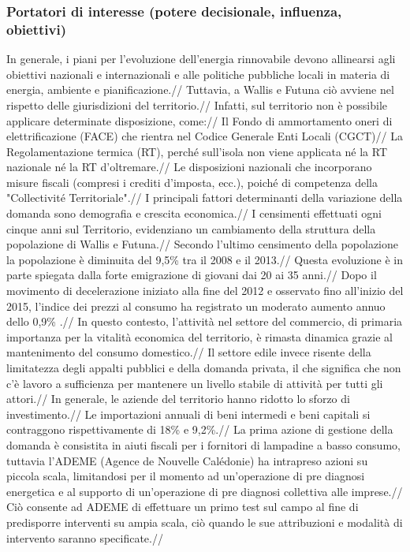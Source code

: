\documentclass[fleqn,10pt]{SelfArx} %
\begin{document}
\subsubsection{Portatori di interesse (potere decisionale, influenza, obiettivi)}
In generale, i piani per l'evoluzione dell'energia rinnovabile devono allinearsi agli obiettivi nazionali e internazionali e alle politiche pubbliche locali in materia di energia, ambiente e pianificazione.// 
Tuttavia, a Wallis e Futuna ciò avviene nel rispetto delle giurisdizioni del territorio.// 
Infatti, sul territorio non è possibile applicare determinate  disposizione, come://
Il Fondo di ammortamento oneri di elettrificazione (FACE) che rientra nel Codice Generale Enti Locali (CGCT)//
La Regolamentazione termica (RT), perché sull'isola non viene applicata né la RT nazionale né la RT d'oltremare.//
Le disposizioni nazionali che incorporano misure fiscali (compresi i crediti d'imposta, ecc.), poiché di competenza della "Collectivité Territoriale".//
I principali fattori determinanti della variazione della domanda sono demografia e crescita economica.//
I censimenti effettuati ogni cinque anni sul Territorio, evidenziano un cambiamento della struttura della popolazione di Wallis e Futuna.//
Secondo l'ultimo censimento della popolazione la popolazione è diminuita del 9,5\% tra il 2008 e il 2013.//
Questa evoluzione è in parte spiegata dalla forte emigrazione di giovani dai 20 ai 35 anni.//
Dopo il movimento di decelerazione iniziato alla fine del 2012 e osservato fino all'inizio del 2015, l'indice dei prezzi al consumo ha registrato un moderato aumento annuo dello 0,9\% .// 
In questo contesto, l'attività nel settore del commercio, di primaria importanza per la vitalità economica del territorio, è rimasta dinamica grazie al mantenimento del consumo domestico.// 
Il settore edile invece risente della limitatezza degli appalti pubblici e della domanda privata, il che significa che non c'è lavoro a sufficienza per  mantenere un livello stabile di attività per tutti gli attori.//
In generale, le aziende del territorio hanno ridotto lo sforzo di investimento.//
Le importazioni annuali di beni intermedi e beni capitali si contraggono rispettivamente di 18\% e 9,2\%.//
La prima azione di gestione della domanda è consistita in aiuti fiscali per i fornitori di lampadine a basso consumo, tuttavia l'ADEME (Agence de Nouvelle Calédonie) ha intrapreso azioni su piccola scala, limitandosi per il momento ad un'operazione di pre diagnosi energetica e al supporto di un'operazione di pre diagnosi collettiva alle imprese.//
Ciò consente ad ADEME di effettuare un primo test sul campo al fine di predisporre interventi su ampia scala, ciò quando le sue attribuzioni e modalità di intervento saranno specificate.//
\end{document}
